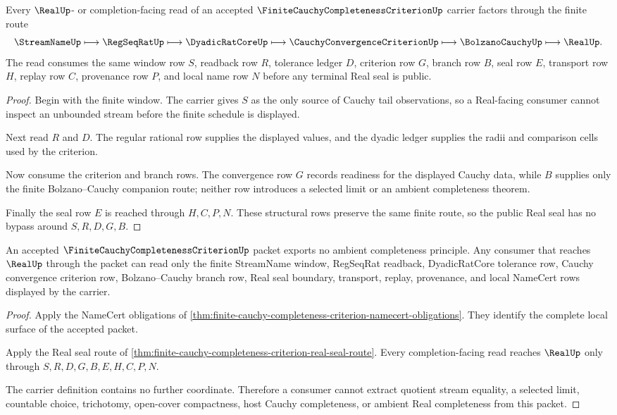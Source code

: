 \begin{theorem}
\label{thm:finite-cauchy-completeness-criterion-real-seal-route}
Every $\RealUp$- or completion-facing read of an accepted $\FiniteCauchyCompletenessCriterionUp$ carrier factors through the finite route
$$
\StreamNameUp \longmapsto \RegSeqRatUp \longmapsto \DyadicRatCoreUp \longmapsto \CauchyConvergenceCriterionUp \longmapsto \BolzanoCauchyUp \longmapsto \RealUp .
$$
The read consumes the same window row $S$, readback row $R$, tolerance ledger $D$, criterion row $G$, branch row $B$, seal row $E$, transport row $H$, replay row $C$, provenance row $P$, and local name row $N$ before any terminal Real seal is public.
\end{theorem}
\begin{proof}
Begin with the finite window. The carrier gives $S$ as the only source of Cauchy tail observations, so a Real-facing consumer cannot inspect an unbounded stream before the finite schedule is displayed.

Next read $R$ and $D$. The regular rational row supplies the displayed values, and the dyadic ledger supplies the radii and comparison cells used by the criterion.

Now consume the criterion and branch rows. The convergence row $G$ records readiness for the displayed Cauchy data, while $B$ supplies only the finite Bolzano--Cauchy companion route; neither row introduces a selected limit or an ambient completeness theorem.

Finally the seal row $E$ is reached through $H,C,P,N$. These structural rows preserve the same finite route, so the public Real seal has no bypass around $S,R,D,G,B$.
\end{proof}

\begin{theorem}
\label{thm:finite-cauchy-completeness-criterion-nonescape}
An accepted $\FiniteCauchyCompletenessCriterionUp$ packet exports no ambient completeness principle. Any consumer that reaches $\RealUp$ through the packet can read only the finite StreamName window, RegSeqRat readback, DyadicRatCore tolerance row, Cauchy convergence criterion row, Bolzano--Cauchy branch row, Real seal boundary, transport, replay, provenance, and local NameCert rows displayed by the carrier.
\end{theorem}
\begin{proof}
Apply the NameCert obligations of \autoref{thm:finite-cauchy-completeness-criterion-namecert-obligations}. They identify the complete local surface of the accepted packet.

Apply the Real seal route of \autoref{thm:finite-cauchy-completeness-criterion-real-seal-route}. Every completion-facing read reaches $\RealUp$ only through $S,R,D,G,B,E,H,C,P,N$.

The carrier definition contains no further coordinate. Therefore a consumer cannot extract quotient stream equality, a selected limit, countable choice, trichotomy, open-cover compactness, host Cauchy completeness, or ambient Real completeness from this packet.
\end{proof}

